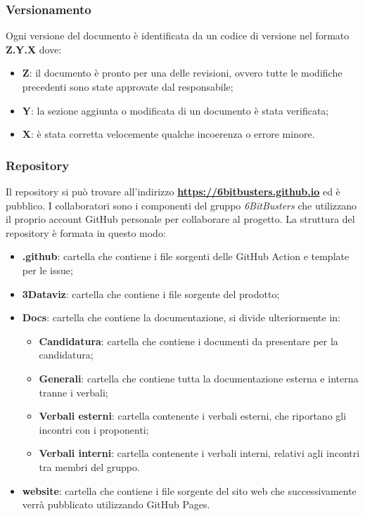 \subsubsection{Versionamento}
Ogni versione del documento è identificata da un codice di versione nel formato
\textbf{Z.Y.X} dove:
\begin{itemize}
      \item \textbf{Z}: il documento è pronto per una delle revisioni, ovvero tutte le modifiche precedenti sono state approvate dal responsabile;
      \item \textbf{Y}: la sezione aggiunta o modificata di un documento è stata verificata;
      \item \textbf{X}: è stata corretta velocemente qualche incoerenza o errore minore.
\end{itemize}
\subsubsection{Repository}
Il repository si può trovare all'indirizzo
\textbf{\url{https://6bitbusters.github.io}} ed è pubblico. I collaboratori
sono i componenti del gruppo \textit{6BitBusters} che utilizzano il proprio
account GitHub personale per collaborare al progetto. La struttura del
repository è formata in questo modo:
\begin{itemize}
      \item \textbf{ .github}: cartella che contiene i file sorgenti delle GitHub Action e template per le issue;
      \item \textbf{3Dataviz}: cartella che contiene i file sorgente del prodotto;
      \item \textbf{Docs}: cartella che contiene la documentazione, si divide ulteriormente in:
            \begin{itemize}
                  \item \textbf{Candidatura}: cartella che contiene i documenti da presentare per la candidatura;
                  \item \textbf{Generali}: cartella che contiene tutta la documentazione esterna e interna tranne i verbali;
                  \item \textbf{Verbali esterni}: cartella contenente i verbali esterni, che riportano gli incontri con i proponenti;
                  \item \textbf{Verbali interni}: cartella contenente i verbali interni, relativi agli incontri tra membri del gruppo.
            \end{itemize}
      \item \textbf{website}: cartella che contiene i file sorgente del sito web che successivamente verrà pubblicato utilizzando GitHub Pages.
\end{itemize}
